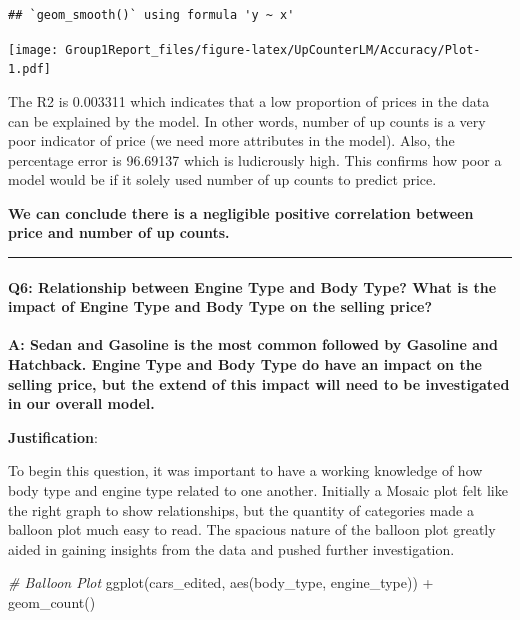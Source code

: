 \documentclass[
]{article}
\newenvironment{Shaded}{\begin{snugshade}}{\end{snugshade}}
\newcommand{\CommentTok}[1]{\textcolor[rgb]{0.56,0.35,0.01}{\textit{#1}}}
\newcommand{\FunctionTok}[1]{\textcolor[rgb]{0.00,0.00,0.00}{#1}}
\newcommand{\NormalTok}[1]{#1}
\newcommand{\SpecialCharTok}[1]{\textcolor[rgb]{0.00,0.00,0.00}{#1}}
\begin{document}
\begin{verbatim}
## `geom_smooth()` using formula 'y ~ x'
\end{verbatim}

\texttt{[image: Group1Report\_files/figure-latex/UpCounterLM/Accuracy/Plot-1.pdf]}

The R2 is 0.003311 which indicates that a low proportion of prices in
the data can be explained by the model. In other words, number of up
counts is a very poor indicator of price (we need more attributes in the
model). Also, the percentage error is 96.69137 which is ludicrously
high. This confirms how poor a model would be if it solely used number
of up counts to predict price.

\textbf{We can conclude there is a negligible positive correlation
between price and number of up counts.}

\begin{center}\rule{0.5\linewidth}{0.5pt}\end{center}

\hypertarget{q6-relationship-between-engine-type-and-body-type-what-is-the-impact-of-engine-type-and-body-type-on-the-selling-price}{%
\paragraph{\texorpdfstring{\textbf{Q6:} Relationship between Engine Type
and Body Type? What is the impact of Engine Type and Body Type on the
selling
price?}{Q6: Relationship between Engine Type and Body Type? What is the impact of Engine Type and Body Type on the selling price?}}\label{q6-relationship-between-engine-type-and-body-type-what-is-the-impact-of-engine-type-and-body-type-on-the-selling-price}}

\textbf{A: Sedan and Gasoline is the most common followed by Gasoline
and Hatchback. Engine Type and Body Type do have an impact on the
selling price, but the extend of this impact will need to be
investigated in our overall model.}

\textbf{Justification}:

To begin this question, it was important to have a working knowledge of
how body type and engine type related to one another. Initially a Mosaic
plot felt like the right graph to show relationships, but the quantity
of categories made a balloon plot much easy to read. The spacious nature
of the balloon plot greatly aided in gaining insights from the data and
pushed further investigation.

\begin{Shaded}
\begin{Highlighting}[]
\CommentTok{\# Balloon Plot}
\FunctionTok{ggplot}\NormalTok{(cars\_edited, }\FunctionTok{aes}\NormalTok{(body\_type, engine\_type)) }\SpecialCharTok{+} \FunctionTok{geom\_count}\NormalTok{()}
\end{Highlighting}
\end{Shaded}
\end{document}
